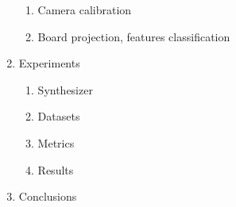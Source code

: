 \begin{enumerate}
\begin{enumerate}[label=(\alph*)]
		      \item Camera calibration
		      \item Board projection, features classification
	      \end{enumerate}
	\item Experiments 
	      \begin{enumerate}[label=(\alph*)]
		      \item Synthesizer
		      \item Datasets
		      \item Metrics
		      \item Results
	      \end{enumerate}
	\item Conclusions
\end{enumerate}


